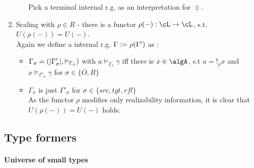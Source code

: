 \documentclass[12pt,a4paper]{article}
\def\rfl{_{refl}}\alwaysmath{rfl}
\renewcommand{\O}{_{O}}\alwaysmath{O}
\def\R{_{R}}\alwaysmath{R}
\begin{document}
\begin{enumerate}[noitemsep]
\begin{itemize}[noitemsep]
    Pick a terminal internal r.g. as an interpretation for $\lozenge$.
  \end{itemize}  
  \item Scaling with $\rho \in R$ - there is a functor $\rho(-) : \cL \to \cL$, s.t. $U(\rho(-)) = U(-)$.\\
  Again we define a internal r.g. $\Gamma := \rho(\Gamma')$ as :
  \begin{itemize}
    \item $\Gamma_\sigma = (|\Gamma'_\sigma|, \vDash_{\Gamma_\sigma})$ with $a \vDash_{\Gamma_\sigma} \gamma$ iff there is $x \in \algA$, s.t $a = !_\rho x$ and $x \vDash_{\Gamma'_\sigma} \gamma$ for $\sigma \in \{O, R\}$
    
    \item $\Gamma_\sigma$ is just $\Gamma'_\sigma$ for $\sigma\in\{src,tgt,rfl\}$ \\
    
    As the functor $\rho$ modifies only realizability information, it is clear that $U(\rho(-)) = U(-)$ holds.
    
  \end{itemize}
  
\end{enumerate}

\subsection*{Type formers}

\paragraph{Universe of small types}
\end{document}
